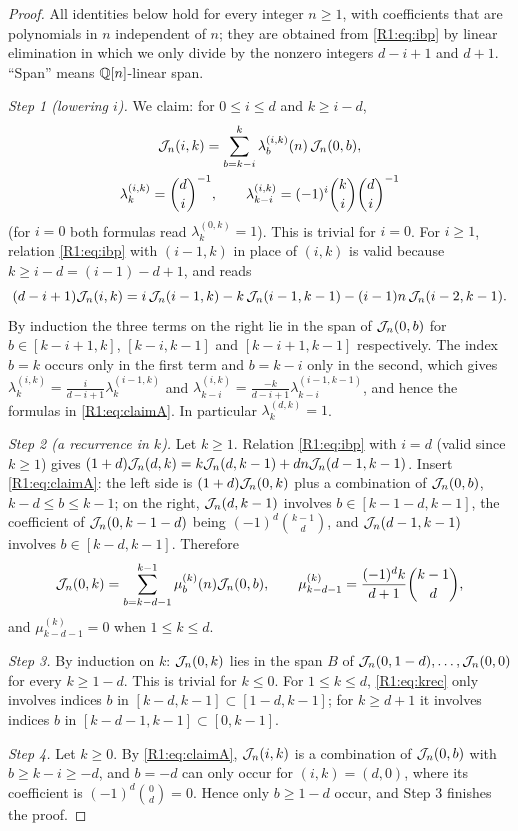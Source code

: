 \documentclass[11pt]{amsart}
\theoremstyle{definition}
\theoremstyle{remark}
\begin{document}
\begin{proof}
All identities below hold for every integer $n\ge1$, with coefficients that are polynomials
in $n$ independent of $n$; they are obtained from \eqref{R1:eq:ibp} by linear elimination in
which we only divide by the nonzero integers $d-i+1$ and $d+1$. ``Span'' means
$\mathbb{Q}[n]$-linear span.

\emph{Step 1 (lowering $i$).} We claim: for $0\le i\le d$ and $k\ge i-d$,
\begin{equation}\label{R1:eq:claimA}
\begin{gathered}
\mathcal{J}_n(i,k)=\sum_{b=k-i}^{k}\lambda^{(i,k)}_b(n)\,\mathcal{J}_n(0,b),\\
\lambda^{(i,k)}_k=\binom{d}{i}^{-1},\qquad
\lambda^{(i,k)}_{k-i}=(-1)^i\binom{k}{i}\binom{d}{i}^{-1}
\end{gathered}
\end{equation}
(for $i=0$ both formulas read $\lambda^{(0,k)}_k=1$). This is trivial for $i=0$. For $i\ge1$,
relation \eqref{R1:eq:ibp} with $(i-1,k)$ in place of $(i,k)$ is valid because
$k\ge i-d=(i-1)-d+1$, and reads
\[
(d-i+1)\mathcal{J}_n(i,k)=i\,\mathcal{J}_n(i-1,k)-k\,\mathcal{J}_n(i-1,k-1)-(i-1)n\,\mathcal{J}_n(i-2,k-1).
\]
By induction the three terms on the right lie in the span of $\mathcal{J}_n(0,b)$ for
$b\in[k-i+1,k]$, $[k-i,k-1]$ and $[k-i+1,k-1]$ respectively. The index $b=k$ occurs only in
the first term and $b=k-i$ only in the second, which gives
$\lambda^{(i,k)}_k=\frac{i}{d-i+1}\lambda^{(i-1,k)}_k$ and
$\lambda^{(i,k)}_{k-i}=\frac{-k}{d-i+1}\lambda^{(i-1,k-1)}_{k-i}$, and hence the formulas in
\eqref{R1:eq:claimA}. In particular $\lambda^{(d,k)}_k=1$.

\emph{Step 2 (a recurrence in $k$).} Let $k\ge1$. Relation \eqref{R1:eq:ibp} with $i=d$
(valid since $k\ge1$) gives $(1+d)\mathcal{J}_n(d,k)=k\mathcal{J}_n(d,k-1)+dn\mathcal{J}_n(d-1,k-1)$.
Insert \eqref{R1:eq:claimA}: the left side is $(1+d)\mathcal{J}_n(0,k)$ plus a combination of
$\mathcal{J}_n(0,b)$, $k-d\le b\le k-1$; on the right, $\mathcal{J}_n(d,k-1)$ involves $b\in[k-1-d,k-1]$,
the coefficient of $\mathcal{J}_n(0,k-1-d)$ being $(-1)^d\binom{k-1}{d}$, and $\mathcal{J}_n(d-1,k-1)$
involves $b\in[k-d,k-1]$. Therefore
\begin{equation}\label{R1:eq:krec}
\mathcal{J}_n(0,k)=\sum_{b=k-d-1}^{k-1}\mu^{(k)}_b(n)\mathcal{J}_n(0,b),\qquad
\mu^{(k)}_{k-d-1}=\frac{(-1)^dk}{d+1}\binom{k-1}{d},
\end{equation}
and $\mu^{(k)}_{k-d-1}=0$ when $1\le k\le d$.

\emph{Step 3.} By induction on $k$: $\mathcal{J}_n(0,k)$ lies in the span $B$ of
$\mathcal{J}_n(0,1-d),\dots,\mathcal{J}_n(0,0)$ for every $k\ge1-d$. This is trivial for $k\le0$. For
$1\le k\le d$, \eqref{R1:eq:krec} only involves indices $b$ in $[k-d,k-1]\subset[1-d,k-1]$;
for $k\ge d+1$ it involves indices $b$ in $[k-d-1,k-1]\subset[0,k-1]$.

\emph{Step 4.} Let $k\ge0$. By \eqref{R1:eq:claimA}, $\mathcal{J}_n(i,k)$ is a combination of
$\mathcal{J}_n(0,b)$ with $b\ge k-i\ge-d$, and $b=-d$ can only occur for $(i,k)=(d,0)$, where its
coefficient is $(-1)^d\binom{0}{d}=0$. Hence only $b\ge1-d$ occur, and Step 3 finishes the
proof.
\end{proof}
\end{document}
